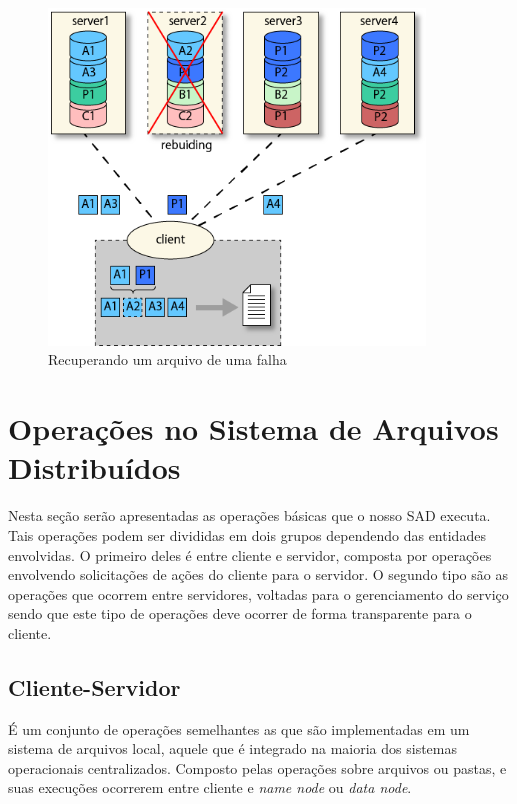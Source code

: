 \begin{figure}[htb]
	\begin{center}
		
		\includegraphics[clip,width=10.0cm]{images/image2.png}
		\caption{Recuperando um arquivo de uma falha}
		\label{fig:img2}
	\end{center}
\end{figure}

\section{Operações no Sistema de Arquivos Distribuídos}

Nesta seção serão apresentadas as operações básicas que o nosso SAD executa. Tais operações podem ser divididas em dois grupos dependendo das entidades envolvidas. O primeiro deles é entre cliente e servidor, composta por operações envolvendo solicitações de ações do cliente para o servidor. O segundo tipo são as operações que ocorrem entre servidores, voltadas para o gerenciamento do serviço sendo que este tipo de operações deve ocorrer de forma transparente para o cliente.
\\

\subsection{Cliente-Servidor}

É um conjunto de operações semelhantes as que são implementadas em um sistema de arquivos local, aquele que é integrado na maioria dos sistemas operacionais centralizados. Composto pelas operações sobre arquivos ou pastas, e suas execuções ocorrerem entre cliente e \textit{name node} ou \textit{data node}.

